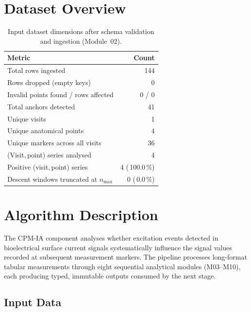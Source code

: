 \documentclass[a4paper,11pt]{article}
\begin{document}
\section{Dataset Overview}

\begin{table}[h!]
\centering
\small
\caption{Input dataset dimensions after schema validation and ingestion (Module~02).}
\begin{tabular}{lr}
\toprule
\textbf{Metric} & \textbf{Count} \\
\midrule
Total rows ingested                        & 144 \\
Rows dropped (empty keys)                  & 0 \\
Invalid points found / rows affected       & 0 / 0 \\
Total anchors detected                     & 41 \\
Unique visits                          & 1 \\
Unique anatomical points               & 4 \\
Unique markers across all visits       & 36 \\
(Visit,\,point) series analysed        & 4 \\
Positive (visit,\,point) series        & 4 (\,100.0\,\%) \\
Descent windows truncated at $n_{\max}$ & 0 (\,0.0\,\%) \\
\bottomrule
\end{tabular}
\end{table}

\section{Algorithm Description}

The CPM-IA component analyses whether excitation events detected in bioelectrical surface
current signals systematically influence the signal values recorded at subsequent measurement
markers. The pipeline processes long-format tabular measurements through eight sequential
analytical modules (M03--M10), each producing typed, immutable outputs consumed by the next
stage.

\subsection{Input Data}
\end{document}
